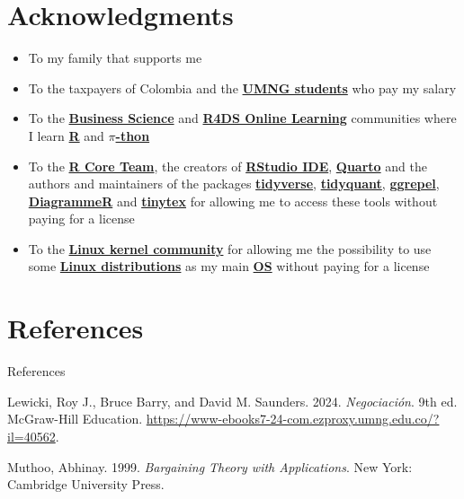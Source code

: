 \documentclass[
  ignorenonframetext,
]{beamer}
\newlength{\cslhangindent}
\newenvironment{CSLReferences}[2] %
 {\begin{list}{}{%
  \setlength{\itemindent}{0pt}
  \setlength{\leftmargin}{0pt}
  \setlength{\parsep}{0pt}
  \ifodd #1
   \setlength{\leftmargin}{\cslhangindent}
   \setlength{\itemindent}{-1\cslhangindent}
  \fi
  \setlength{\itemsep}{#2\baselineskip}}}
 {\end{list}}
\begin{document}
\section{Acknowledgments}\label{acknowledgments}

\begin{frame}{}
\label{section-18}
\begin{itemize}
\item
  To my family that supports me
\item
  To the taxpayers of Colombia and the
  \href{https://www.umng.edu.co/estudiante}{\textbf{UMNG students}} who
  pay my salary
\item
  To the \href{https://www.business-science.io/}{\textbf{Business
  Science}} and \href{https://www.rfordatasci.com/}{\textbf{R4DS Online
  Learning}} communities where I learn
  \href{https://www.r-project.org/about.html}{\textbf{R}} and
  \href{https://www.python.org/about/}{\textbf{\(\pi\)-thon}}
\item
  To the \href{https://www.r-project.org/contributors.html}{\textbf{R
  Core Team}}, the creators of
  \href{https://rstudio.com/products/rstudio/}{\textbf{RStudio IDE}},
  \href{https://quarto.org/}{\textbf{Quarto}} and the authors and
  maintainers of the packages
  \href{https://CRAN.R-project.org/package=tidyverse}{\textbf{tidyverse}},
  \href{https://CRAN.R-project.org/package=tidyquant}{\textbf{tidyquant}},
  \href{https://CRAN.R-project.org/package=ggrepel}{\textbf{ggrepel}},
  \href{https://CRAN.R-project.org/package=DiagrammeR}{\textbf{DiagrammeR}}
  and
  \href{https://CRAN.R-project.org/package=tinytex}{\textbf{tinytex}}
  for allowing me to access these tools without paying for a license
\item
  To the \href{https://www.kernel.org/category/about.html}{\textbf{Linux
  kernel community}} for allowing me the possibility to use some
  \href{https://static.lwn.net/Distributions/}{\textbf{Linux
  distributions}} as my main
  \href{https://en.wikipedia.org/wiki/Operating_system}{\textbf{OS}}
  without paying for a license
\end{itemize}
\end{frame}

\section*{References}\label{references}

\begin{frame}[allowframebreaks]{References}
\label{refs}
\begin{CSLReferences}{1}{0}
Lewicki, Roy J., Bruce Barry, and David M. Saunders. 2024.
\emph{Negociación}. 9th ed. McGraw-Hill Education.
\url{https://www-ebooks7-24-com.ezproxy.umng.edu.co/?il=40562}.

Muthoo, Abhinay. 1999. \emph{Bargaining Theory with Applications}. New
York: Cambridge University Press.

\end{CSLReferences}
\end{frame}
\end{document}
